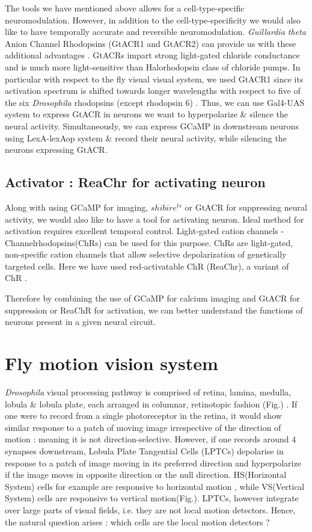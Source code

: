 The tools we have mentioned above allows for a cell-type-specific neuromodulation. However, in addition to the cell-type-specificity we would also like to have temporally accurate and reversible neuromodulation. \textit{Guillardia theta} Anion Channel Rhodopsins (GtACR1 and GtACR2) can provide us with these additional advantages \parencite{Govorunova2015}. GtACRs impart strong light-gated chloride conductance and is much more light-sensitive than Halorhodopsin class of chloride pumps. In particular with respect to the fly visual visual system, we used GtACR1 since its activation spectrum is shifted towards longer wavelengths with respect to five of the six \textit{Drosophila} rhodopsins (except rhodopsin 6) \parencite{Mauss2017, Mohammad2017}. Thus, we can use Gal4-UAS system to express GtACR in neurons we want to hyperpolarize \& silence the neural activity. Simultaneously, we can express GCaMP in downstream neurons using LexA-lexAop system \& record their neural activity, while silencing the neurons expressing GtACR. 

 
\subsection{Activator : ReaChr for activating neuron}
Along with using GCaMP for imaging, $shibire^{ts}$ or GtACR for suppressing neural activity, we would also like to have a tool for activating neuron. Ideal method for activation requires excellent temporal control. Light-gated cation channels - Channelrhodopsins(ChRs) can be used for this purpose. ChRs are light-gated, non-specific cation channels that allow selective depolarization of genetically targeted cells. Here we have used red-activatable ChR (ReaChr), a variant of ChR \parencite{Lin2013, Busch2018}. 

Therefore by combining the use of GCaMP for calcium imaging and GtACR for suppression or ReaChR for activation, we can better understand the functions of neurons present in a given neural circuit.


\section{Fly motion vision system}
\textit{Drosophila} visual processing pathway is comprised of retina, lamina, medulla, lobula \& lobula plate, each arranged in columnar, retinotopic fashion (Fig.) \parencite{Fischbach1989}. If one were to record from a single photoreceptor in the retina, it would show similar response to a patch of moving image irrespective of the direction of motion : meaning it is not direction-selective. However, if one records around 4 synapses downstream, Lobula Plate Tangential Cells (LPTCs) depolarise in response to a patch of image moving in its preferred direction and hyperpolarize if the image moves in opposite direction or the null direction. HS(Horizontal System) cells for example are responsive to horizontal motion \parencite{Schnell2010}, while VS(Vertical System) cells are responsive to vertical motion\parencite{Joesch2008}(Fig.). LPTCs, however integrate over large parts of visual fields, i.e. they are not local motion detectors. Hence, the natural question arises : which cells are the local motion detectors ? 

